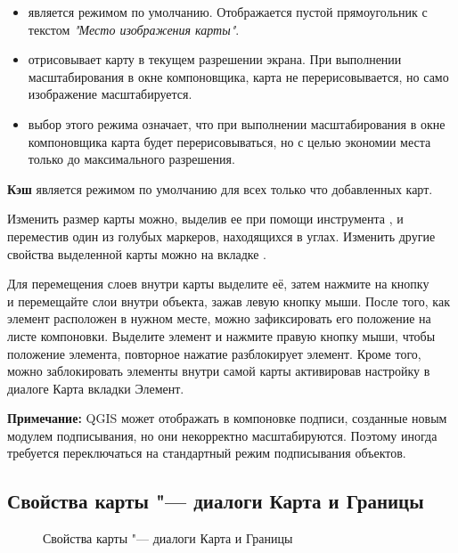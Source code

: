 \begin{itemize}[label=--]
\item {} является режимом по
умолчанию. Отображается пустой прямоугольник с текстом
\textit{"Место изображения карты"}.
\item {} отрисовывает карту в текущем
разрешении экрана. При выполнении масштабирования в окне компоновщика,
карта не перерисовывается, но само изображение масштабируется.
\item {} выбор этого режима
означает, что при выполнении масштабирования в окне компоновщика карта
будет перерисовываться, но с целью экономии места только до
максимального разрешения.
\end{itemize}

\textbf{Кэш} является режимом по умолчанию для всех только что
добавленных карт.

Изменить размер карты можно, выделив ее при помощи инструмента
,
и переместив один из голубых маркеров, находящихся в углах. Изменить
другие свойства выделенной карты можно на вкладке .

Для перемещения слоев внутри карты выделите её, затем нажмите на кнопку \\
 и
перемещайте слои внутри объекта, зажав левую кнопку мыши.
После того, как элемент расположен в нужном месте, можно зафиксировать
его положение на листе компоновки. Выделите элемент и нажмите правую
кнопку мыши, чтобы  положение
элемента, повторное нажатие разблокирует элемент. Кроме того, можно
заблокировать элементы внутри самой карты активировав настройку
 в диалоге Карта вкладки
Элемент.

\textbf{Примечание:} QGIS \CURRENT может отображать в компоновке подписи,
созданные новым модулем подписывания, но они некорректно масштабируются.
Поэтому иногда требуется переключаться на стандартный режим подписывания
объектов.

\subsection{Свойства карты "--- диалоги Карта и Границы}

\begin{figure}[ht]
  \centering
    \hspace{1cm}
  \caption{Свойства карты "--- диалоги Карта и Границы \wincaption}\label{fig:mapdialog}
\end{figure}

